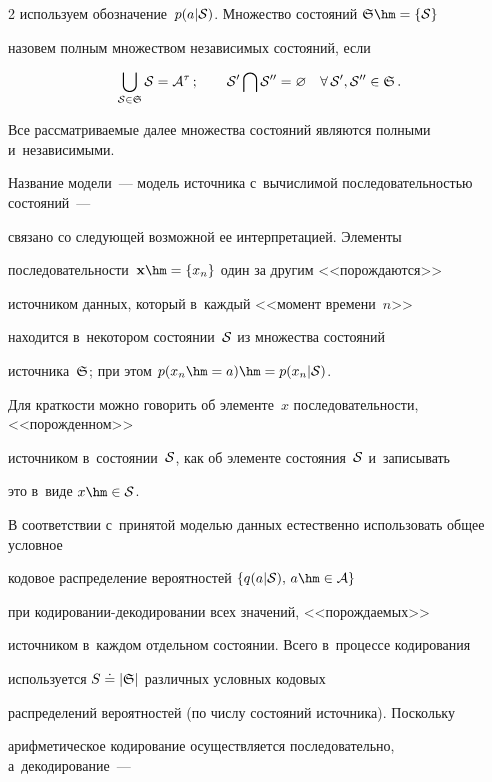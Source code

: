 \begin{multicols}{2}
используем обозначение~$p(a|{\cal S})$. Множество состояний ${\frak S}\hm=\{\cal S\}$ 

назовем полным множеством независимых состояний, если

$$

\bigcup\limits_{{\cal S}\in{\frak S}}{\cal S} = {\cal A}^\tau\,;

\quad  \quad

{\cal S}'\bigcap{\cal S}'' = \varnothing\quad

\forall\,{\cal S}',{\cal S}''\in{\frak S}\,.

$$

Все рассматриваемые далее множества состояний являются полными и~независимыми.



Название модели~--- модель источника с~вы\-чис\-ли\-мой последовательностью состояний~--- 

связано со следующей возможной ее интерпретацией. Элементы 

последовательности~$\mathbf{x}\hm=\{x_n\}$ один за другим <<порождаются>> 

источником данных, который в~каж\-дый <<момент времени~$n$>>  

находится в~некотором состоянии~${\cal S}$ из множества состояний 

источника~${\frak S}$; при этом $p(x_n\hm=a)\hm= p(x_n|{\cal S})$. 

Для краткости можно говорить об элементе~$x$ последовательности, <<порожденном>> 

источником в~состоянии~${\cal S}$, как об элементе состояния~${\cal S}$ и~записывать 

это в~виде $x\hm\in{\cal S}$.



В соответствии с~принятой моделью данных естественно использовать общее условное 

кодовое распределение вероятностей $\{q(a|{\cal S}),\,a\hm\in{\cal A}\}$ 

при ко\-ди\-ро\-ва\-нии-де\-ко\-ди\-ро\-ва\-нии всех значений, <<порождаемых>> 

источником в~каждом отдельном состоянии. Всего в~процессе кодирования 

используется $S\doteq|{\frak S}|$ различных условных кодовых 

распределений вероятностей (по числу состояний источника). Поскольку 

арифметическое кодирование осуществляется последовательно, а~декодирование~--- 


\end{multicols}
